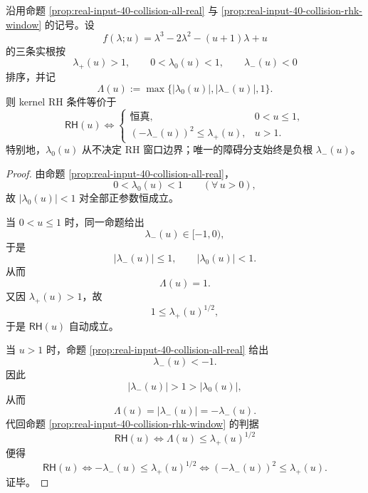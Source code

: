 \begin{theorem}\label{thm:xi-time-part62d-collision-rh-negative-branch-control}
沿用命题 \ref{prop:real-input-40-collision-all-real} 与
\ref{prop:real-input-40-collision-rhk-window} 的记号。设
\[
f(\lambda;u)=\lambda^3-2\lambda^2-(u+1)\lambda+u
\]
的三条实根按
\[
\lambda_+(u)>1,\qquad 0<\lambda_0(u)<1,\qquad \lambda_-(u)<0
\]
排序，并记
\[
\Lambda(u):=\max\{|\lambda_0(u)|,|\lambda_-(u)|,1\}.
\]
则 kernel RH 条件等价于
\[
\textsf{RH}(u)\iff
\begin{cases}
\text{恒真}, & 0<u\le 1,\\[1mm]
(-\lambda_-(u))^2\le \lambda_+(u), & u>1.
\end{cases}
\]
特别地，\(\lambda_0(u)\) 从不决定 RH 窗口边界；唯一的障碍分支始终是负根 \(\lambda_-(u)\)。
\end{theorem}
\begin{proof}
由命题 \ref{prop:real-input-40-collision-all-real}，
\[
0<\lambda_0(u)<1
\qquad(\forall\,u>0),
\]
故 \(|\lambda_0(u)|<1\) 对全部正参数恒成立。

当 \(0<u\le 1\) 时，同一命题给出
\[
\lambda_-(u)\in[-1,0),
\]
于是
\[
|\lambda_-(u)|\le 1,\qquad |\lambda_0(u)|<1.
\]
从而
\[
\Lambda(u)=1.
\]
又因 \(\lambda_+(u)>1\)，故
\[
1\le \lambda_+(u)^{1/2},
\]
于是 \(\textsf{RH}(u)\) 自动成立。

当 \(u>1\) 时，命题 \ref{prop:real-input-40-collision-all-real} 给出
\[
\lambda_-(u)<-1.
\]
因此
\[
|\lambda_-(u)|>1>|\lambda_0(u)|,
\]
从而
\[
\Lambda(u)=|\lambda_-(u)|=-\lambda_-(u).
\]
代回命题 \ref{prop:real-input-40-collision-rhk-window} 的判据
\[
\textsf{RH}(u)\iff \Lambda(u)\le \lambda_+(u)^{1/2}
\]
便得
\[
\textsf{RH}(u)\iff -\lambda_-(u)\le \lambda_+(u)^{1/2}
\iff
(-\lambda_-(u))^2\le \lambda_+(u).
\]
证毕。
\end{proof}

